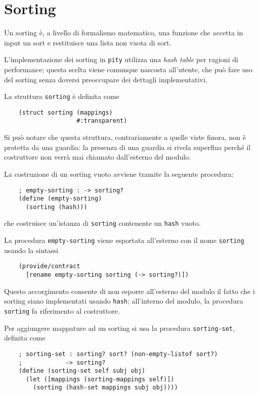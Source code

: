 \section{Sorting}

Un sorting \`e, a livello di formalismo matematico, una funzione che
accetta in input un sort e restituisce una lista non vuota di sort.

L'implementazione dei sorting in \lstinline{pity} utilizza una
\emph{hash table} per ragioni di performance; questa scelta viene
comunque nascosta all'utente, che pu\`o fare uso del sorting senza
doversi preoccupare dei dettagli implementativi.

La struttura \lstinline{sorting} \`e definita come

\begin{lstlisting}
    (struct sorting (mappings)
                    #:transparent)
\end{lstlisting}

Si pu\`o notare che questa struttura, contrariamente a quelle viste
finora, non \`e protetta da una guardia: la presenza di una guardia si
rivela superflua perch\'e il costruttore non verr\`a mai chiamato
dall'esterno del modulo.

La costruzione di un sorting vuoto avviene tramite la seguente procedura:

\begin{lstlisting}
    ; empty-sorting : -> sorting?
    (define (empty-sorting)
      (sorting (hash)))
\end{lstlisting}

che costruisce un'istanza di \lstinline{sorting} contenente un
\lstinline{hash} vuoto.

La procedura \lstinline{empty-sorting} viene esportata all'esterno con
il nome \lstinline{sorting} usando la sintassi

\begin{lstlisting}
    (provide/contract
      [rename empty-sorting sorting (-> sorting?)])
\end{lstlisting}

Questo accorgimento consente di non esporre all'esterno del modulo il
fatto che i sorting siano implementati usando \lstinline{hash};
all'interno del modulo, la procedura \lstinline{sorting} fa riferimento
al costruttore.

Per aggiungere mappature ad un sorting si usa la procedura
\lstinline{sorting-set}, definita come

\begin{lstlisting}
    ; sorting-set : sorting? sort? (non-empty-listof sort?)
    ;            -> sorting?
    (define (sorting-set self subj obj)
      (let ([mappings (sorting-mappings self)])
        (sorting (hash-set mappings subj obj))))
\end{lstlisting}

